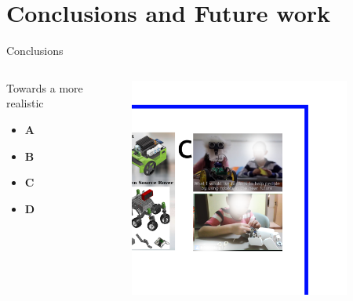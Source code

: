 \section{Conclusions and Future work}

{
\begin{frame}{Conclusions}

  \begin{columns}
    \begin{column}{.3\linewidth}
      Towards a more realistic
  \begin{itemize}
    \item \textbf{A}
    \item \textbf{B}
    \item \textbf{C}
    \item \textbf{D}
  \end{itemize}

    \end{column}


  \begin{column}{.6\linewidth}

      \begin{figure}
        \centering
        \includegraphics[width=0.9\textwidth]{./figures/future-work/versions/drawing-v00.png}
      \end{figure}

    \end{column}
  \end{columns}


\end{frame}
}
